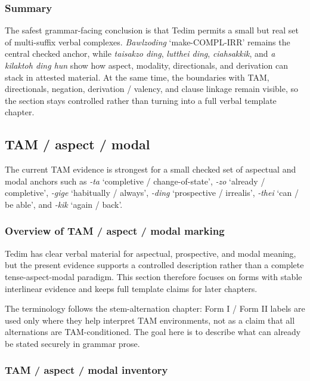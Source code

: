 \documentclass[
  11pt,
  a4paper,
]{article}
\newcommand{\tdim}[1]{\textit{#1}}
\newcommand{\glossquote}[1]{`#1'}
\begin{document}
\subsubsection{Summary}\label{summary-5}

The safest grammar-facing conclusion is that Tedim permits a small but
real set of multi-suffix verbal complexes. \tdim{Bawlzoding}
\glossquote{make-COMPL-IRR} remains the central checked anchor, while
\tdim{taisakzo ding}, \tdim{lutthei ding}, \tdim{ciahsakkik}, and
\tdim{a kilaktoh ding hun} show how aspect, modality, directionals, and
derivation can stack in attested material. At the same time, the
boundaries with TAM, directionals, negation, derivation / valency, and
clause linkage remain visible, so the section stays controlled rather
than turning into a full verbal template chapter.

\subsection{TAM / aspect / modal}\label{tam-aspect-modal}

The current TAM evidence is strongest for a small checked set of
aspectual and modal anchors such as \tdim{-ta}
\glossquote{completive / change-of-state}, \tdim{-zo}
\glossquote{already / completive}, \tdim{-gige}
\glossquote{habitually / always}, \tdim{-ding}
\glossquote{prospective / irrealis}, \tdim{-thei}
\glossquote{can / be able}, and \tdim{-kik} \glossquote{again / back}.

\subsubsection{Overview of TAM / aspect / modal
marking}\label{overview-of-tam-aspect-modal-marking}

Tedim has clear verbal material for aspectual, prospective, and modal
meaning, but the present evidence supports a controlled description
rather than a complete tense-aspect-modal paradigm. This section
therefore focuses on forms with stable interlinear evidence and keeps
full template claims for later chapters.

The terminology follows the stem-alternation chapter: Form I / Form II
labels are used only where they help interpret TAM environments, not as
a claim that all alternations are TAM-conditioned. The goal here is to
describe what can already be stated securely in grammar prose.

\subsubsection{TAM / aspect / modal
inventory}\label{tam-aspect-modal-inventory}
\end{document}
